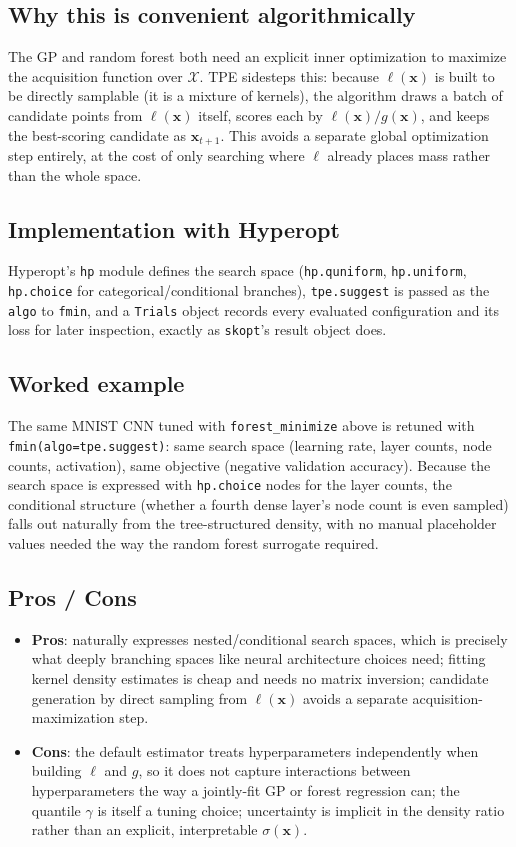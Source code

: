 \documentclass[conference]{IEEEtran}
\begin{document}
\subsection*{Why this is convenient algorithmically}
The GP and random forest both need an explicit inner optimization to maximize the acquisition function over $\mathcal{X}$. TPE sidesteps this: because $\ell(\mathbf{x})$ is built to be directly samplable (it is a mixture of kernels), the algorithm draws a batch of candidate points from $\ell(\mathbf{x})$ itself, scores each by $\ell(\mathbf{x})/g(\mathbf{x})$, and keeps the best-scoring candidate as $\mathbf{x}_{t+1}$. This avoids a separate global optimization step entirely, at the cost of only searching where $\ell$ already places mass rather than the whole space.

\subsection*{Implementation with Hyperopt}
Hyperopt's \texttt{hp} module defines the search space (\texttt{hp.quniform}, \texttt{hp.uniform}, \texttt{hp.choice} for categorical/conditional branches), \texttt{tpe.suggest} is passed as the \texttt{algo} to \texttt{fmin}, and a \texttt{Trials} object records every evaluated configuration and its loss for later inspection, exactly as \texttt{skopt}'s result object does.

\subsection*{Worked example}
The same MNIST CNN tuned with \texttt{forest\_minimize} above is retuned with \texttt{fmin(algo=tpe.suggest)}: same search space (learning rate, layer counts, node counts, activation), same objective (negative validation accuracy). Because the search space is expressed with \texttt{hp.choice} nodes for the layer counts, the conditional structure (whether a fourth dense layer's node count is even sampled) falls out naturally from the tree-structured density, with no manual placeholder values needed the way the random forest surrogate required.

\subsection*{Pros / Cons}
\begin{itemize}
    \item \textbf{Pros}: naturally expresses nested/conditional search spaces, which is precisely what deeply branching spaces like neural architecture choices need; fitting kernel density estimates is cheap and needs no matrix inversion; candidate generation by direct sampling from $\ell(\mathbf{x})$ avoids a separate acquisition-maximization step.
    \item \textbf{Cons}: the default estimator treats hyperparameters independently when building $\ell$ and $g$, so it does not capture interactions between hyperparameters the way a jointly-fit GP or forest regression can; the quantile $\gamma$ is itself a tuning choice; uncertainty is implicit in the density ratio rather than an explicit, interpretable $\sigma(\mathbf{x})$.
\end{itemize}
\end{document}
